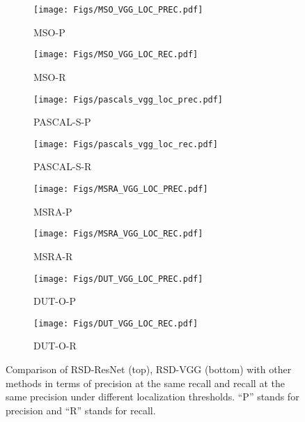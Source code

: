 \documentclass[10pt,twocolumn,letterpaper]{article}
\begin{document}
\begin{figure*}[t]
    \begin{subfigure}[b]{0.12\textwidth}
        \texttt{[image: Figs/MSO\_VGG\_LOC\_PREC.pdf]}
        \caption{{\scriptsize MSO-P}}
        \label{fig:mso_res}
    \end{subfigure}
            \hspace{-0.2cm}
    \begin{subfigure}[b]{0.12\textwidth}
        \texttt{[image: Figs/MSO\_VGG\_LOC\_REC.pdf]}
        \caption{{\scriptsize MSO-R}}
        \label{fig:MSRA_res}
    \end{subfigure}
            \hspace{-0.2cm}
     \begin{subfigure}[b]{0.12\textwidth}
        \texttt{[image: Figs/pascals\_vgg\_loc\_prec.pdf]}
        \caption{{\scriptsize PASCAL-S-P}}
    \end{subfigure}
        \hspace{-0.2cm}
    \begin{subfigure}[b]{0.12\textwidth}
        \texttt{[image: Figs/pascals\_vgg\_loc\_rec.pdf]}
        \caption{{\scriptsize PASCAL-S-R}}
    \end{subfigure}
     \hspace{-0.2cm}
    \begin{subfigure}[b]{0.12\textwidth}
        \texttt{[image: Figs/MSRA\_VGG\_LOC\_PREC.pdf]}
        \caption{{\scriptsize MSRA-P}}
    \end{subfigure}
            \hspace{-0.2cm}
        \begin{subfigure}[b]{0.12\textwidth}
        \texttt{[image: Figs/MSRA\_VGG\_LOC\_REC.pdf]}
        \caption{{\scriptsize MSRA-R}}
    \end{subfigure}
            \hspace{-0.2cm}
        \begin{subfigure}[b]{0.12\textwidth}
        \texttt{[image: Figs/DUT\_VGG\_LOC\_PREC.pdf]}
        \caption{{\scriptsize DUT-O-P}}

    \end{subfigure}
            \hspace{-0.2cm}
        \begin{subfigure}[b]{0.17\textwidth}
        \texttt{[image: Figs/DUT\_VGG\_LOC\_REC.pdf]}
        \caption{{\scriptsize DUT-O-R}}
    \end{subfigure}
    \vspace{-2mm}
    \caption{Comparison of RSD-ResNet (top), RSD-VGG (bottom) with other methods in terms of precision at the same recall and recall at the same precision under different localization thresholds. {``P'' stands for precision and ``R'' stands for recall.}}
    \label{fig:iou}
\end{figure*}
\end{document}
